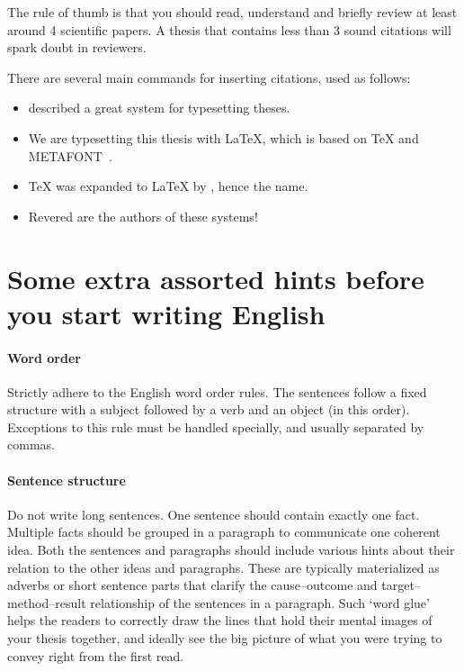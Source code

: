 \begin{description}
The rule of thumb is that you should read, understand and briefly review at least around 4 scientific papers. A thesis that contains less than 3 sound citations will spark doubt in reviewers.
\end{description}

There are several main commands for inserting citations, used as follows:
\begin{itemize}
\item \citet{knuth1979tex} described a great system for typesetting theses.
\item We are typesetting this thesis with \LaTeX, which is based on \TeX{} and METAFONT~\cite{knuth1979tex}.
\item \TeX{} was expanded to \LaTeX{} by \citet{lamport1994latex}, hence the name.
\item Revered are the authors of these systems!~\cite{knuth1979tex,lamport1994latex}
\end{itemize}

\section{Some extra assorted hints before you start writing English}

\paragraph{Word order}
Strictly adhere to the English word order rules. The sentences follow a fixed structure with a subject followed by a verb and an object (in this order). Exceptions to this rule must be handled specially, and usually separated by commas.

\paragraph{Sentence structure}
Do not write long sentences. One sentence should contain exactly one fact. Multiple facts should be grouped in a paragraph to communicate one coherent idea. Both the sentences and paragraphs should include various hints about their relation to the other ideas and paragraphs. These are typically materialized as adverbs or short sentence parts that clarify the cause--outcome and target--method--result relationship of the sentences in a paragraph. Such `word glue' helps the readers to correctly draw the lines that hold their mental images of your thesis together, and ideally see the big picture of what you were trying to convey right from the first read.

